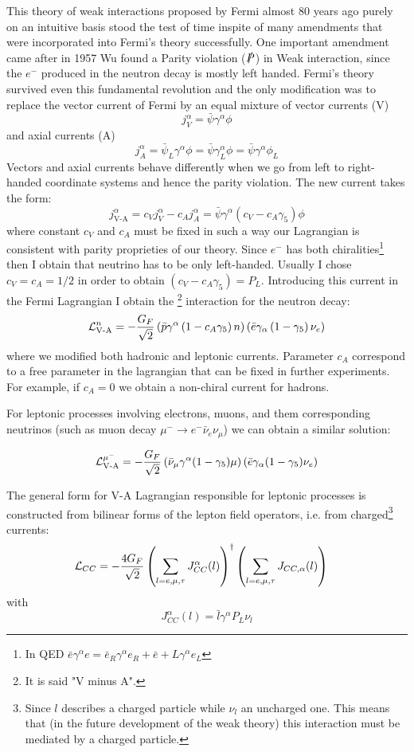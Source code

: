 \documentclass[TheoreticalPhy_ModB.tex]{subfiles}
\begin{document}
This theory of weak interactions proposed by Fermi almost 80 years ago purely on an intuitive basis stood the test of time inspite of many amendments that were incorporated into Fermi's theory successfully.  One important amendment came after in 1957 Wu found a Parity violation ($\slashed P$) in Weak interaction, since the $e^-$ produced in the neutron decay is mostly left handed. Fermi's theory survived even this fundamental revolution and the only modification was to replace the vector current of Fermi by an equal mixture of vector currents (V)
\[j_V^\alpha=\bar \psi\gamma^\alpha \phi\]
and axial currents (A)
\[j^\alpha_A=\bar \psi_L\gamma^\alpha\phi=\bar \psi\gamma^\alpha_L\phi=\bar \psi\gamma^\alpha\phi_L\]
Vectors and axial currents behave differently when we go from left to right-handed coordinate systems and hence the parity violation. The new current takes the form:
\[j^\alpha_{\text{V-A}}=c_Vj^\alpha_V-c_Aj^\alpha_A=\bar \psi\gamma^\alpha(c_V-c_A\gamma_5)\phi\]
where constant $c_V$ and $c_A$ must be fixed in such a way our Lagrangian is consistent with parity proprieties of our theory.
Since $e^-$ has both chiralities\footnote{In QED $\bar e\gamma^\alpha e=\bar e_R\gamma^\alpha e_R+\bar e+L\gamma^\alpha e_L$} then I obtain that neutrino has to be only left-handed. Usually I chose $c_V=c_A=1/2$ in order to obtain $(c_V-c_A\gamma_5)=P_L$. Introducing this current in the Fermi Lagrangian I obtain the \footnote{It is said "V minus A".} interaction for the neutron decay:
\[\mathcal L_{\text{V-A}}^n=-\frac {G_F}{\sqrt2} \left(\bar p\gamma^\alpha\left(1-c_A\gamma_5\right) n\right)\left(\bar e \gamma_\alpha\left(1-\gamma_5\right)\nu_e\right)\]
where we modified both hadronic and leptonic currents. Parameter $c_A$ correspond to a free parameter in the lagrangian that can be fixed in further experiments. For example, if $c_A=0$ we obtain a non-chiral current for hadrons.

For leptonic processes involving electrons, muons, and them corresponding neutrinos (such as muon decay $\mu^-\to e^-\bar\nu_e\nu_\mu$) we can obtain a similar solution:

\[\mathcal L_{\text{V-A}}^{\mu^-}=-\frac {G_F}{\sqrt2} \left(\bar \nu_\mu\gamma^\alpha (1-\gamma_5)\mu\right)\left(\bar e \gamma_\alpha (1-\gamma_5)\nu_e\right)\]

The general form for V-A Lagrangian responsible for leptonic processes is constructed from bilinear forms of the lepton field operators, i.e. from charged\footnote{Since $l$ describes a charged particle while $\nu_l$ an uncharged one. This means that (in the future development of the weak theory) this interaction must be mediated by a charged particle.} currents:
\begin{align}\label{eqn:charged-lagrangian-VA}
\mathcal L_{CC}
&=-\frac{4G_F}{\sqrt2}\left(\sum_{l=e,\mu,\tau}J_{CC}^{\alpha}(l)\right)^\dagger\left(\sum_{l=e,\mu,\tau}J_{CC,\alpha}(l)\right)
\end{align}
with
\begin{equation}\label{eqn:charged-current-VA}
J_{CC}^{\alpha}(l)=\bar l\gamma^\alpha P_L\nu_l
\end{equation}
\end{document}

